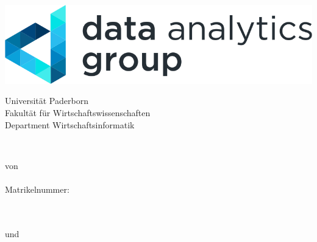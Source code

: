 \vfil

\begin{titlepage}

        \begin{center}
        	\includegraphics[scale=1.]{img/data_analytics_group.png}
        \end{center}
        
        \vspace{7ex}
        
        \begin{center}
            
            Universität Paderborn\\
            Fakultät für Wirtschaftswissenschaften\\
            Department Wirtschaftsinformatik\\
            
            \vspace{7ex}
            
            \Large
            \abschlussarbeit\\
            
            \vspace{4ex}
            
            \textbf{\sffamily{\titel}}
            
            \vspace{5ex}
            
            \normalsize
            
            von\\
            \vspace{2ex}
            \nameFirst\\
            Matrikelnummer:~\matrikelnummerFirst\\
            \adresseFirst\\
            \upbmailFirst\\
                        \vspace{2ex}

            und\\
                        \vspace{2ex}


\end{center}
\end{titlepage}
